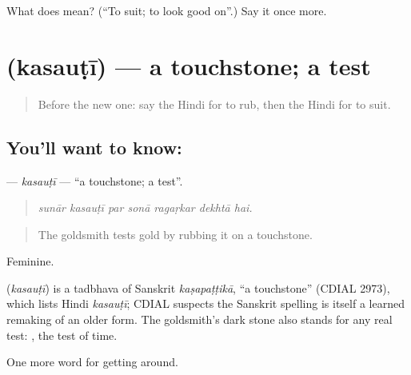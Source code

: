 \begin{tcolorbox}[breakable,colback=teal!4,colframe=teal!35!black,title={Before you move on}]
What does  mean? (\textquotedblleft{}To suit; to look good on\textquotedblright{}.) Say it once more.
\end{tcolorbox}
\section[\texorpdfstring{\hi{कसौटी} (kasauṭī)}{कसौटी (kasauṭī)}]{ (kasauṭī) — a touchstone; a test}

\label{lesson:HI-C434-kasauti}



\begin{quote}
Before the new one: say the Hindi for to rub, then the Hindi for to suit.
\end{quote}

\subsection*{You'll want to know: }
\textbf{} — \emph{kasauṭī} — \textquotedblleft{}a touchstone; a test\textquotedblright{}.

\begin{quote}
      
\end{quote}

\begin{quote}
\emph{sunār kasauṭī par sonā ragaṛkar dekhtā hai.}
\end{quote}

\begin{quote}
The goldsmith tests gold by rubbing it on a touchstone.
\end{quote}

Feminine.

\begin{cousinweb}
\textbf{} (\emph{kasauṭī}) is a tadbhava of Sanskrit \emph{kaṣapaṭṭikā}, \textquotedblleft{}a touchstone\textquotedblright{} (CDIAL 2973), which lists Hindi \emph{kasauṭī}; CDIAL suspects the Sanskrit spelling is itself a learned remaking of an older form. The goldsmith's dark stone also stands for any real test:   , the test of time.
\end{cousinweb}

\begin{grammarlens}[title={What you've built}]
One more word for getting around.
\end{grammarlens}

